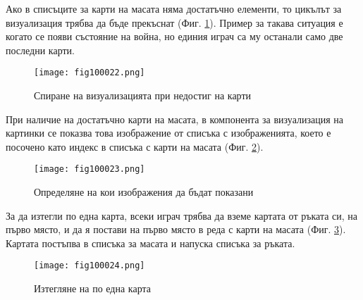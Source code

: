 Ако в списъците за карти на масата няма достатъчно елементи, то цикълът за визуализация трябва да бъде прекъснат (Фиг. \ref{fig100022}). Пример за такава ситуация е когато се появи състояние на война, но единия играч са му останали само две последни карти.

\begin{figure}[H]
  \centering
  \texttt{[image: fig100022.png]}
  \caption{Спиране на визуализацията при недостиг на карти}
\label{fig100022}
\end{figure}

При наличие на достатъчно карти на масата, в компонента за визуализация на картинки се показва това изображение от списъка с изображенията, което е посочено като индекс в списъка с карти на масата (Фиг. \ref{fig100023}).

\begin{figure}[H]
  \centering
  \texttt{[image: fig100023.png]}
  \caption{Определяне на кои изображения да бъдат показани}
\label{fig100023}
\end{figure}

За да изтегли по една карта, всеки играч трябва да вземе картата от ръката си, на първо място, и да я постави на първо място в реда с карти на масата (Фиг. \ref{fig100024}). Картата постъпва в списъка за масата и напуска списъка за ръката.

\begin{figure}[H]
  \centering
  \texttt{[image: fig100024.png]}
  \caption{Изтегляне на по една карта}
\label{fig100024}
\end{figure}

